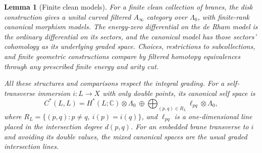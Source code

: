 \documentclass[11pt]{article}
\numberwithin{equation}{section}
\newtheorem{lemma}[theorem]{Lemma}
\theoremstyle{definition}
\theoremstyle{remark}
\newcommand{\C}{\mathbb C}
\begin{document}
\begin{lemma}[Finite clean models]
 \label{lem:finite-clean-models}
For a finite clean collection of branes, the disk construction gives a
unital curved filtered $A_\infty$ category over $\Lambda_0$, with
finite-rank canonical morphism models.  The energy-zero differential on
the de Rham model is the ordinary differential on its sectors, and the
canonical model has those sectors' cohomology as its underlying graded
space.  Choices, restrictions to subcollections, and finite geometric
constructions compare by filtered homotopy equivalences through any
prescribed finite energy and arity cut.

All these structures and comparisons respect the integral grading.
For a self-transverse immersion $i:L\to X$ with only double points, its
canonical self space is
\begin{equation}
 \label{eq:floer-self-space}
 C^*(L,L)=H^*(L;\C)\otimes\Lambda_0
 \ \oplus\!\bigoplus_{(p,q)\in R_L}
 \ell_{pq}\otimes\Lambda_0,
\end{equation}
where $R_L=\{(p,q):p\ne q,\ i(p)=i(q)\}$, and $\ell_{pq}$ is a
one-dimensional line placed in the intersection degree $d(p,q)$.
For an embedded brane transverse to $i$ and avoiding its double values,
the mixed canonical spaces are the usual graded intersection lines.
\end{lemma}
\end{document}
